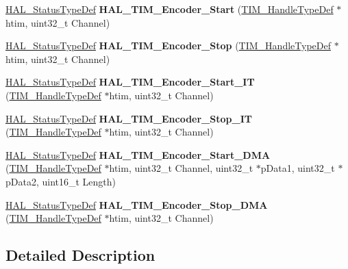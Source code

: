 \begin{DoxyCompactItemize}
\item 
\mbox{\label{group___t_i_m___exported___functions___group6_ga6450b21fa2bf6bf71a0f85c0a1519e21}} 
\hyperlink{stm32f0xx__hal__def_8h_a63c0679d1cb8b8c684fbb0632743478f}{H\+A\+L\+\_\+\+Status\+Type\+Def} {\bfseries H\+A\+L\+\_\+\+T\+I\+M\+\_\+\+Encoder\+\_\+\+Start} (\hyperlink{struct_t_i_m___handle_type_def}{T\+I\+M\+\_\+\+Handle\+Type\+Def} $\ast$htim, uint32\+\_\+t Channel)
\item 
\mbox{\label{group___t_i_m___exported___functions___group6_ga2d603e9167803b080be1f2915e972bbf}} 
\hyperlink{stm32f0xx__hal__def_8h_a63c0679d1cb8b8c684fbb0632743478f}{H\+A\+L\+\_\+\+Status\+Type\+Def} {\bfseries H\+A\+L\+\_\+\+T\+I\+M\+\_\+\+Encoder\+\_\+\+Stop} (\hyperlink{struct_t_i_m___handle_type_def}{T\+I\+M\+\_\+\+Handle\+Type\+Def} $\ast$htim, uint32\+\_\+t Channel)
\item 
\mbox{\label{group___t_i_m___exported___functions___group6_ga9a573a3203752709841acab8412f541e}} 
\hyperlink{stm32f0xx__hal__def_8h_a63c0679d1cb8b8c684fbb0632743478f}{H\+A\+L\+\_\+\+Status\+Type\+Def} {\bfseries H\+A\+L\+\_\+\+T\+I\+M\+\_\+\+Encoder\+\_\+\+Start\+\_\+\+IT} (\hyperlink{struct_t_i_m___handle_type_def}{T\+I\+M\+\_\+\+Handle\+Type\+Def} $\ast$htim, uint32\+\_\+t Channel)
\item 
\mbox{\label{group___t_i_m___exported___functions___group6_gac07923b4764255a1e0b82c975689542d}} 
\hyperlink{stm32f0xx__hal__def_8h_a63c0679d1cb8b8c684fbb0632743478f}{H\+A\+L\+\_\+\+Status\+Type\+Def} {\bfseries H\+A\+L\+\_\+\+T\+I\+M\+\_\+\+Encoder\+\_\+\+Stop\+\_\+\+IT} (\hyperlink{struct_t_i_m___handle_type_def}{T\+I\+M\+\_\+\+Handle\+Type\+Def} $\ast$htim, uint32\+\_\+t Channel)
\item 
\mbox{\label{group___t_i_m___exported___functions___group6_ga8b9798534ad0917d31d581afe720d8cf}} 
\hyperlink{stm32f0xx__hal__def_8h_a63c0679d1cb8b8c684fbb0632743478f}{H\+A\+L\+\_\+\+Status\+Type\+Def} {\bfseries H\+A\+L\+\_\+\+T\+I\+M\+\_\+\+Encoder\+\_\+\+Start\+\_\+\+D\+MA} (\hyperlink{struct_t_i_m___handle_type_def}{T\+I\+M\+\_\+\+Handle\+Type\+Def} $\ast$htim, uint32\+\_\+t Channel, uint32\+\_\+t $\ast$p\+Data1, uint32\+\_\+t $\ast$p\+Data2, uint16\+\_\+t Length)
\item 
\mbox{\label{group___t_i_m___exported___functions___group6_ga12ea48505e269532feff5b64f605b56f}} 
\hyperlink{stm32f0xx__hal__def_8h_a63c0679d1cb8b8c684fbb0632743478f}{H\+A\+L\+\_\+\+Status\+Type\+Def} {\bfseries H\+A\+L\+\_\+\+T\+I\+M\+\_\+\+Encoder\+\_\+\+Stop\+\_\+\+D\+MA} (\hyperlink{struct_t_i_m___handle_type_def}{T\+I\+M\+\_\+\+Handle\+Type\+Def} $\ast$htim, uint32\+\_\+t Channel)
\end{DoxyCompactItemize}


\subsection{Detailed Description}
